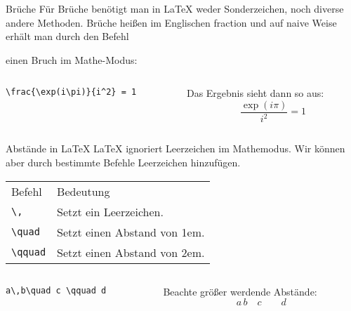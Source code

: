 \begin{frame}[fragile]{Brüche}
Für Brüche benötigt man in \LaTeX{} weder Sonderzeichen, noch diverse andere Methoden. Brüche heißen im Englischen \glqq fraction\grqq{} und auf naive Weise erhält man durch den Befehl
\begin{center}
\end{center}
einen Bruch im Mathe-Modus:
\begin{columns}
\begin{column}{0.55\textwidth}
\begin{codeblock}
\begin{verbatim}
\frac{\exp(i\pi)}{i^2} = 1
\end{verbatim}
\end{codeblock}
\end{column}
\begin{column}{0.35\textwidth}
Das Ergebnis sieht dann so aus:
\[
    \frac{\exp(i\pi)}{i^2} = 1
\]
\end{column}
\end{columns}
\end{frame}


\begin{frame}[fragile]{Abstände in \LaTeX}
\LaTeX{} ignoriert Leerzeichen im Mathemodus. Wir können aber durch bestimmte Befehle Leerzeichen hinzufügen.\pause
\begin{center}
\begin{tabular}{p{}p{}}
Befehl & Bedeutung\\
\verb+\,+ & Setzt ein Leerzeichen. \\
\verb+\quad+ & Setzt einen Abstand von 1em. \\
\verb+\qquad+ & Setzt einen Abstand von 2em.
\end{tabular}
\end{center}\pause
\begin{columns}
\begin{column}{0.4\textwidth}
\begin{codeblock}
\begin{verbatim}
a\,b\quad c \qquad d
\end{verbatim}
\end{codeblock}
\end{column}
\begin{column}{0.35\textwidth}
Beachte größer werdende Abstände: 
\[
a\,b\quad c \qquad d
\]
\end{column}
\end{columns}
\end{frame}



